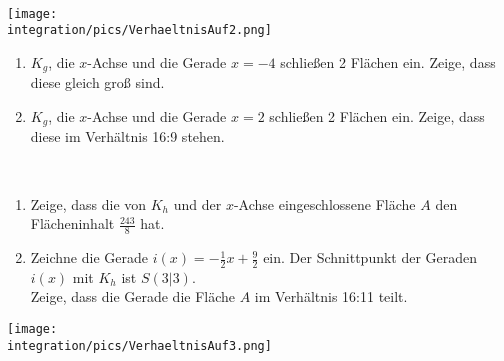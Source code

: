 \documentclass[a4paper,12pt, headsepline, ngerman]{scrartcl}
\theoremstyle{definition}
\begin{document}
\begin{Exercise}[title={\raggedright\normalfont Gegeben sind die Funktion \(g(x)=\frac{1}{6}x^3+\frac{1}{2}x^2\) und ihr Schaubild \(K_g\).}, label=verhaltnisFlaechenA2]\\
\begin{minipage}{\textwidth}
	\begin{minipage}{.6\textwidth}
		\texttt{[image: \\integration/pics/VerhaeltnisAuf2.png]}
	\end{minipage}
	\begin{minipage}{.4\textwidth}\raggedright
		\begin{enumerate}[label=\alph*)]
			\item \(K_g\), die \(x\)-Achse und die Gerade \(x=-4\) schließen 2 Flächen ein. Zeige, dass diese gleich groß sind.
			\item \(K_g\), die \(x\)-Achse und die Gerade \(x=2\) schließen 2 Flächen ein. Zeige, dass diese im Verhältnis 16:9 stehen.		
		\end{enumerate}
	\end{minipage}
\end{minipage}
\end{Exercise}

\begin{Exercise}[title={\raggedright\normalfont Gegeben sind die Funktion \(h(x)=-\frac{1}{18}x^3+\frac{1}{2}x^2\) und ihr Schaubild \(K_h\).}, label=verhaltnisFlaechenA3]\\
	\begin{minipage}{\textwidth}
		\begin{minipage}{.4\textwidth}\raggedright
			\begin{enumerate}[label=\alph*)]
				\item Zeige, dass die von \(K_h\) und der \(x\)-Achse eingeschlossene Fläche \(A\) den Flächeninhalt \(\frac{243}{8}\) hat.
				\item Zeichne die Gerade \(i(x)=-\frac{1}{2}x+\frac{9}{2}\) ein. Der Schnittpunkt der Geraden \(i(x)\) mit \(K_h\) ist \(S(3\vert 3)\).\\
				Zeige, dass die Gerade die Fläche \(A\) im Verhältnis 16:11 teilt.					
			\end{enumerate}
		\end{minipage}
		\begin{minipage}{.6\textwidth}
			\texttt{[image: \\integration/pics/VerhaeltnisAuf3.png]}
		\end{minipage}
	\end{minipage}
\end{Exercise}
\end{document}
